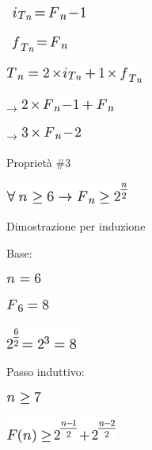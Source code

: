 \documentclass{article}
\begin{document}
{}

{~}\includegraphics{images/image52.png}

{~}\includegraphics{images/image53.png}

{}

\includegraphics{images/image54.png}

{→ }\includegraphics{images/image55.png}

{→ }\includegraphics{images/image56.png}{~}

{Proprietà \#3}

{}

\includegraphics{images/image57.png}

{Dimostrazione per induzione}

{Base:}

\includegraphics{images/image58.png}

\includegraphics{images/image59.png}

\includegraphics{images/image60.png}

{Passo induttivo:}

\includegraphics{images/image61.png}

{}

\includegraphics{images/image62.png}
\end{document}
